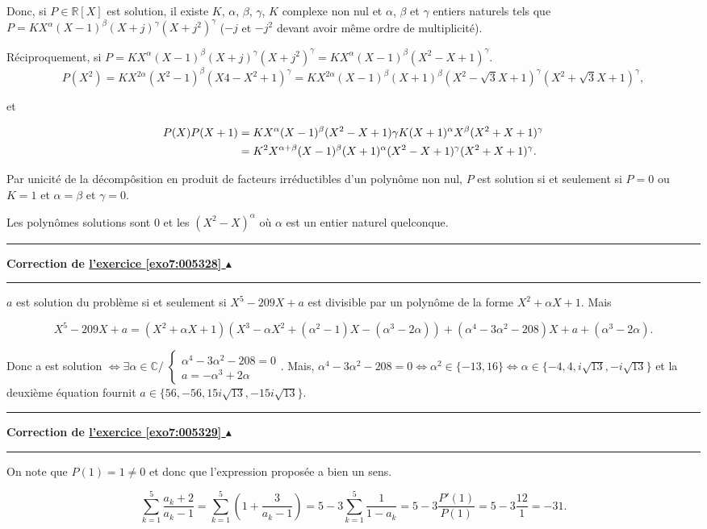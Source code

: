 \documentclass[11pt,a4paper]{article}
\newcommand{\Rr}{\mathbb{R}} \newcommand{\R}{\mathbb{R}}
\newcommand{\Cc}{\mathbb{C}} \newcommand{\C}{\mathbb{C}}
\newcounter{exo}
\newcommand{\correction}[1]{\hypertarget{cor7:#1}{}\label{cor7:#1}{\bf Correction de \hyperlink{exo7:#1}{l'exercice \ref{exo7:#1} $\blacktriangle$}}\vspace{1mm}\hrule\vspace{1mm}}
\newcommand{\fincorrection}{\vspace{1mm}\hrule\vspace*{7mm}}
\begin{document}
Donc, si $P\in\Rr[X]$ est solution, il existe $K$, $\alpha$, $\beta$, $\gamma$, $K$ complexe non nul et $\alpha$, $\beta$ et $\gamma$ entiers naturels tels que $P=KX^\alpha(X-1)^\beta(X+j)^\gamma(X+j^2)^\gamma$ ($-j$ et $-j^2$ devant avoir même ordre de multiplicité).

Réciproquement, si $P=KX^\alpha(X-1)^\beta(X+j)^\gamma(X+j^2)^\gamma=KX^\alpha(X-1)^\beta(X^2-X+1)^\gamma$.
$$P(X^2)=KX^{2\alpha}(X^2-1)^\beta(X4-X^2+1)^\gamma=KX^{2\alpha}(X-1)^\beta(X+1)^\beta(X^2-\sqrt{3}X+1)^\gamma(X^2+
\sqrt{3}X+1)^\gamma,$$

et 

\begin{align*}\ensuremath
P(X)P(X+1)&=KX^\alpha(X-1)^\beta(X^2-X+1)\gamma K(X+1)^\alpha X^\beta(X^2+X+1)^\gamma\\
 &=K^2X^{\alpha+\beta}(X-1)^\beta(X+1)^\alpha(X^2-X+1)^\gamma(X^2+X+1)^\gamma.
\end{align*}

Par unicité de la décompôsition en produit de facteurs irréductibles d'un polynôme non nul, $P$ est solution si et seulement si $P=0$ ou $K=1$ et $\alpha=\beta$ et $\gamma=0$.

Les polynômes solutions sont $0$ et les $(X^2-X)^\alpha$ où $\alpha$ est un entier naturel quelconque.
\fincorrection
\correction{005328}
$a$ est solution du problème si et seulement si $X^5-209X+a$ est divisible par un polynôme de la forme $X^2+\alpha X+1$. Mais 

$$X^5-209X+a=(X^2+\alpha X+1)(X^3-\alpha X^2+(\alpha^2-1)X-(\alpha^3-2\alpha))+(\alpha^4-3\alpha^2-208)X+a+(\alpha^3-2\alpha).$$

Donc a est solution $\Leftrightarrow\exists\alpha\in\Cc/\;\left\{
\begin{array}{l}
\alpha^4-3\alpha^2-208=0\\
a=-\alpha^3+2\alpha
\end{array}
\right.$. Mais, $\alpha^4-3\alpha^2-208=0\Leftrightarrow\alpha^2\in\{-13,16\}\Leftrightarrow\alpha\in\{-4,4,i\sqrt{13},-i\sqrt{13}\}$ et la deuxième équation fournit $a\in\{56,-56,15i\sqrt{13},-15i\sqrt{13}\}$.

\fincorrection
\correction{005329}
On note que $P(1)=1\neq0$ et donc que l'expression proposée a bien un sens.

$$\sum_{k=1}^{5}\frac{a_k+2}{a_k-1}=\sum_{k=1}^{5}(1+\frac{3}{a_k-1})=5-3\sum_{k=1}^{5}\frac{1}{1-a_k}=5-3\frac{P'(1)}{P(1)}=5-3\frac{12}{1}=-31.$$
\end{document}
